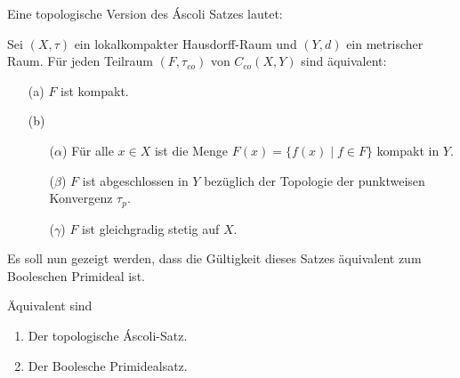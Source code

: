 Eine topologische Version des Áscoli Satzes lautet:
\begin{defn}
  Sei $(X,\tau)$ ein lokalkompakter Hausdorff-Raum und $(Y,d)$ ein metrischer Raum.
  Für jeden Teilraum $(F,\tau_{co})$ von $C_{co}(X,Y)$ sind äquivalent:
  \begin{enumerate}
    \item[(a)] $F$ ist kompakt.
    \item[(b)] \begin{enumerate}
        \item[($\alpha$)] Für alle $x \in X$ ist die Menge $F(x) = \{f(x) \mid f \in F \}$ kompakt in $Y$.
        \item[($\beta$)]  $F$ ist abgeschlossen in $Y$ bezüglich der Topologie der punktweisen Konvergenz $\tau_p$.
        \item[($\gamma$)] $F$ ist gleichgradig stetig auf $X$.
      \end{enumerate}
  \end{enumerate}
\end{defn}

Es soll nun gezeigt werden, dass die Gültigkeit dieses Satzes äquivalent zum Booleschen Primideal ist.

\begin{thm}
  \label{thm:ascoliPIT}
  Äquivalent sind
  \begin{enumerate}
    \item Der topologische Áscoli-Satz.
    \item Der Boolesche Primidealsatz.
  \end{enumerate}
\end{thm}


